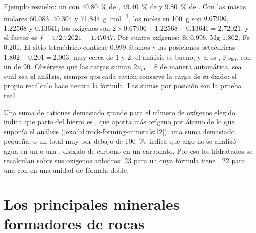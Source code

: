 Ejemplo resuelto: un  con \qty{40.80}{\percent} de , \qty{49.40}{\percent} de  y
\qty{9.80}{\percent} de . Con las masas molares \num{60.083}, \num{40.304} y \qty{71.844}{g.mol^{-1}}, los
moles en \qty{100}{g} son $0.67906$, $1.22568$ y $0.13641$; los oxígenos son $2\times0.67906 + 1.22568 + 0.13641 = 2.72021$,
y el factor es $f = 4/2.72021 = 1.47047$. Por cuatro oxígenos: Si \num{0.999}, Mg \num{1.802}, Fe \num{0.201}. El
sitio tetraédrico contiene \num{0.999} átomos y las posiciones octaédricas $1.802 + 0.201 = 2.003$, muy cerca de 1 y 2:
el análisis es bueno, y el  es , $\text{Fo}_{90}$, con un  de 90.
Obsérvese que las cargas suman $2n_O = 8$ de manera automática, sea cual sea el análisis, siempre que cada catión
conserve la carga de su óxido: el propio recálculo hace neutra la fórmula. Las sumas por posición son la prueba real.

Una suma de cationes demasiado grande para el número de oxígenos elegido indica que parte del hierro es
, que aporta más oxígeno por átomo de lo que suponía el análisis
(\cref{exo:b1:rock-forming-minerals:12}); una suma demasiado pequeña, o un total muy por debajo de
\qty{100}{\percent}, indica que algo no se analizó ---agua en un  o una , dióxido de carbono en un
carbonato. Por eso los  hidratados se recalculan sobre sus oxígenos anhidros: 23 para un  cuya
fórmula tiene , 22 para una  con  en una unidad de fórmula doble.

\section{Los principales minerales formadores de rocas}

